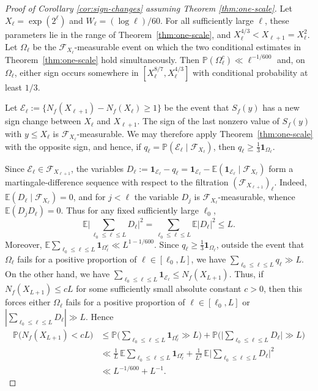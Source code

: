 \documentclass[a4paper,12pt,reqno]{amsart}
\numberwithin{equation}{section}
\theoremstyle{remark}
\newcommand{\E}{\mathbb{E}}
\newcommand{\p}{\mathbb{P}}
\begin{document}
\begin{proof}[Proof of Corollary \ref{cor:sign-changes} assuming Theorem \ref{thm:one-scale}]
Let $X_\ell=\exp(2^\ell)$ and $W_\ell=(\log\ell)/60$. For all
sufficiently large $\ell$, these parameters lie in the range of
Theorem~\ref{thm:one-scale}, and $X_\ell^{4/3}<X_{\ell+1}=X_{\ell}^2$.
{Let $\Omega_\ell$ be the $\mathscr F_{X_\ell}$-measurable event on which
the two conditional estimates in Theorem~\ref{thm:one-scale} hold
simultaneously. Then $\p(\Omega_\ell^c)\ll \ell^{-1/600}$ and, }
on $\Omega_\ell$, either
sign occurs somewhere in $[X_\ell^{8/7},X_\ell^{4/3}]$ with
conditional probability at least $1/3$.

Let $\mathcal E_\ell:=\{N_f(X_{\ell+1})-N_f(X_{\ell})\ge1\}$ be the event that $S_f(y)$ has a new sign change
between $X_\ell$ and $X_{\ell+1}$. The sign of the last nonzero value
of $S_f(y)$ with $y\leq X_\ell$ is $\mathscr F_{X_\ell}$-measurable.
We may therefore apply Theorem~\ref{thm:one-scale} with the opposite
sign, and hence, if
$q_\ell=\p(\mathcal E_\ell\mid\mathscr F_{X_\ell})$, then
$q_\ell\geq \frac13\mathbf 1_{\Omega_\ell}$.

Since $\mathcal E_\ell\in\mathscr F_{X_{\ell+1}}$, the variables
\(
 D_\ell
 :=
 \mathbf 1_{\mathcal E_\ell}-q_\ell
 =
 \mathbf 1_{\mathcal E_\ell}
 -
 \E(\mathbf 1_{\mathcal E_\ell}\mid\mathscr F_{X_\ell})
\)
form a martingale-difference sequence with respect to the filtration
$(\mathscr F_{X_{\ell+1}})_\ell$. Indeed,
$\E(D_\ell\mid\mathscr F_{X_\ell})=0$, and for $j<\ell$ the variable
$D_j$ is $\mathscr F_{X_\ell}$-measurable, whence
$\E(D_jD_\ell)=0$. Thus for any fixed sufficiently large $\ell_0$,
\[
 \E\bigg|
 \sum_{\ell_0\leq\ell\leq L}D_\ell
 \bigg|^2
 =
 \sum_{\ell_0\leq\ell\leq L}\E|D_\ell|^2
 \leq L.
\]
Moreover,
$\E\sum_{\ell_0\leq\ell\leq L}\mathbf 1_{\Omega_\ell^c} \ll L^{1-1/600}$. 
Since $q_\ell\geq\frac13\mathbf 1_{\Omega_\ell}$, outside the event
that $\Omega_\ell$ fails for a positive proportion of
$\ell\in[\ell_0,L]$, we have
$\sum_{\ell_0\leq\ell\leq L}q_\ell\gg L$. On the other hand, we have \( \sum_{\ell_0\leq\ell\leq L}\mathbf 1_{\mathcal E_\ell} \leq N_f(X_{L+1}).
\)
Thus, if $N_f(X_{L+1})\leq cL$ for some sufficiently small absolute constant $c>0$, then this forces either $\Omega_\ell$ fails for a
positive proportion of $\ell\in[\ell_0,L]$ or
$\left|\sum_{\ell_0\leq\ell\leq L}D_\ell\right|\gg L$. 
Hence
\[
\begin{aligned}
 \p\bigl(N_f(X_{L+1})< cL\bigr)
 &\leq
 \p\bigg(
   \sum_{\ell_0\leq\ell\leq L}\mathbf 1_{\Omega_\ell^c}\gg L
 \bigg)
 +
 \p\bigg(
   \bigg|\sum_{\ell_0\leq\ell\leq L}D_\ell\bigg|\gg L
 \bigg) \\
 &\ll
 \frac1L\,
 \E\sum_{\ell_0\leq\ell\leq L}\mathbf 1_{\Omega_\ell^c}
 +
 \frac1{L^2}\,
 \E\bigg|
   \sum_{\ell_0\leq\ell\leq L}D_\ell
 \bigg|^2 \\
 &\ll L^{-1/600}+L^{-1}.
\end{aligned}
\]



\end{proof}
\end{document}

